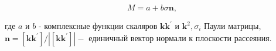 \documentclass[10pt]{article}
\begin{document}
\[

M=a+b \sigma \boldsymbol{n},

\]



где $a$ и $b$ - комплексные функции скаляров $\boldsymbol{k} \boldsymbol{k}^{\prime}$ и $\boldsymbol{k}^{2}, \sigma_{i}$ Паули матрицы, $\boldsymbol{n}=\left[\boldsymbol{k} \boldsymbol{k}^{\prime}\right] /\left|\left[\boldsymbol{k} \boldsymbol{k}^{\prime}\right]\right|-$ единичный вектор нормали к плоскости рассеяния.
\end{document}
